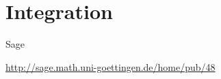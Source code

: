 \documentclass[hyperref={xetex}]{beamer}
\begin{document}

\section{Integration}


\begin{frame}[fragile]{Sage}
 \begin{center}
     \url{http://sage.math.uni-goettingen.de/home/pub/48}
 \end{center}
\end{frame}
\end{document}
